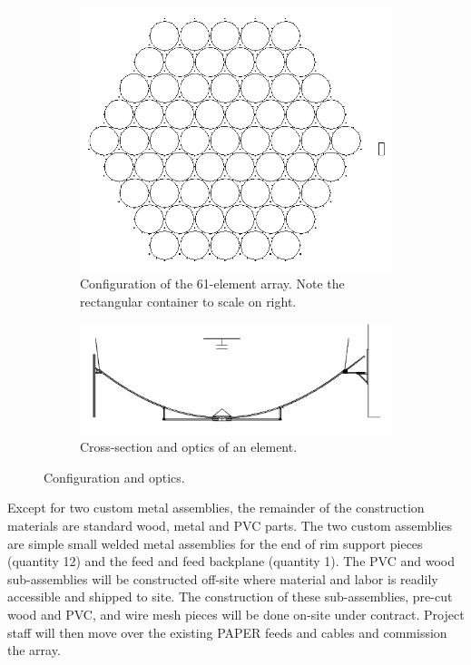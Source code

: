 \documentclass[preprint]{aastex}
\begin{document}
\begin{figure}[h]
	\centering
	\begin{subfigure}[b]{0.35\textwidth}
		\includegraphics[width=\textwidth]{plots/Engineering/hex_61.png}
		\caption{Configuration of the 61-element array.  Note the rectangular container to scale on right.}
		\label{fig:config}
	\end{subfigure}
	\quad
	\begin{subfigure}[b]{0.6\textwidth}
		\includegraphics[width=\textwidth]{plots/Engineering/optics.png}
		\caption{Cross-section and optics of an element.}
		\label{fig:optics}
	\end{subfigure}
	\caption{Configuration and optics.}
	\label{fig:config_optics}
\end{figure}

Except for two custom metal assemblies, the remainder of the construction materials are standard wood, 
metal and PVC parts.  The two custom assemblies are simple small welded metal assemblies for the end of 
rim support pieces (quantity 12) and the feed and feed backplane (quantity 1).  The PVC and wood sub-assemblies 
will be constructed off-site where material and labor is readily accessible and shipped to site.  The 
construction of these sub-assemblies, pre-cut wood and PVC, and wire mesh pieces will be done on-site under 
contract.  Project staff will then move over the existing PAPER feeds and cables and commission the array.  
\end{document}
